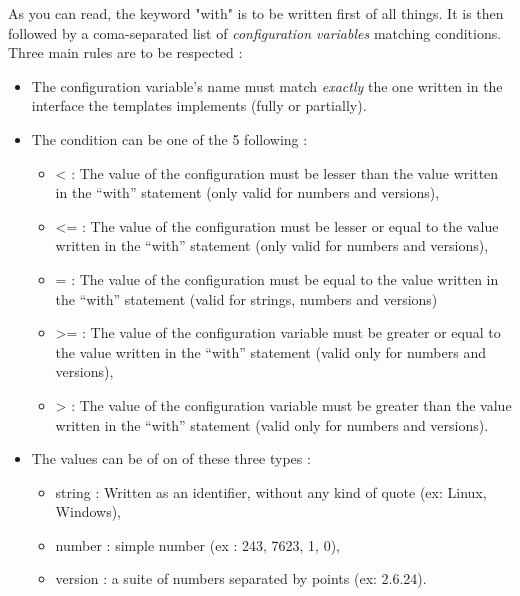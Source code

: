 \documentclass[american]{rtxreport}
\begin{document}
As you can read, the keyword "with" is to be written first of all things. It is
then followed by a coma-separated list of \emph{configuration variables}
matching conditions. Three main rules are to be respected :
\begin{itemize}
    \item The configuration variable's name must match \emph{exactly} the one
          written in the interface the templates implements
          (fully or partially).
    \item The condition can be one of the 5 following : 
        \begin{itemize}
            \item < : The value of the configuration must be lesser than the
                      value written in the “with” statement
                      (only valid for numbers and versions),
            \item <= : The value of the configuration must be lesser or equal
                       to the value written in the “with” statement
                      (only valid for numbers and versions),
            \item = : The value of the configuration must be equal to the
                      value written in the “with” statement
                      (valid for strings, numbers and versions)
            \item >= : The value of the configuration variable must be greater
                       or equal to the value written in the “with” statement
                       (valid only for numbers and versions),
            \item > : The value of the configuration variable must be greater
                      than the value written in the “with” statement
                      (valid only for numbers and versions).
        \end{itemize}
    \item The values can be of on of these three types :
        \begin{itemize}
            \item string : Written as an identifier, without any kind of quote
                           (ex: Linux, Windows),
            \item number : simple number (ex : 243, 7623, 1, 0),
            \item version : a suite of numbers separated by points (ex: 2.6.24).
        \end{itemize}
\end{itemize}
\end{document}

